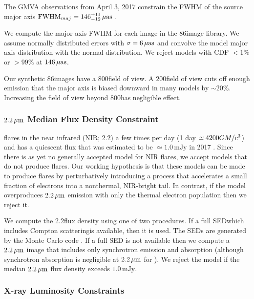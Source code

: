 The GMVA observations from April 3, 2017 constrain the FWHM of the source major axis ${\rm FWHM}_{maj} = 146^{+11}_{-12}\,\mathrm{\mu as}$ \citep[95\% confidence][]{2021ApJ...915...99I}.

We compute the major axis FWHM for each image in the 86\GHz image library.  We assume normally distributed errors with $\sigma = 6\,\mathrm{\mu as}$ and convolve the model major axis distribution with the normal distribution.  We reject models with CDF $< 1\%$ or $> 99\%$ at $146\,\mathrm{\mu as}$.

Our synthetic 86\GHz images have a 800\uas field of view.  A 200\uas field of view cuts off enough emission that the major axis is biased downward in many models by $\sim 20\%$.  Increasing the field of view beyond 800\uas has negligible effect.

\subsubsection{$2.2\,\mu\mathrm{m}$ Median Flux Density Constraint}\label{subsec:nir}

\sgra flares in the near infrared (NIR; 2.2\um) a few times per day (1 day $\simeq 4200 GM/c^3$) \citep{2018ApJ...863...15W} and has a quiescent flux that was estimated to be $\simeq 1.0\,\mathrm{mJy}$ in 2017 \citep{2020A&A...638A...2G}.  Since there is as yet no generally accepted model for NIR flares, we accept models that do not produce flares.  Our working hypothesis is that these models can be made to produce flares by perturbatively introducing a process that accelerates a small fraction of electrons into a nonthermal, NIR-bright tail.  In contrast, if the model overproduces $2.2\,\mu\mathrm{m}$ emission with only the thermal electron population then we reject it.

We compute the 2.2\um flux density using one of two procedures.  If a full SED\textemdash which includes Compton scattering\textemdash is available, then it is used. The SEDs are generated by the \grmonty Monte Carlo code \citep{2009ApJS..184..387D, Wong_2022, Davelaar_2022}. If a full SED is not available then we compute a $2.2\,\mu\mathrm{m}$ image that includes only synchrotron emission and absorption (although synchrotron absorption is negligible at $2.2\,\mu\mathrm{m}$ for \sgra).  We reject the model if the median $2.2\,\mu\mathrm{m}$ flux density exceeds $1.0\,\mathrm{mJy}$.

\subsubsection{X-ray Luminosity Constraints}

